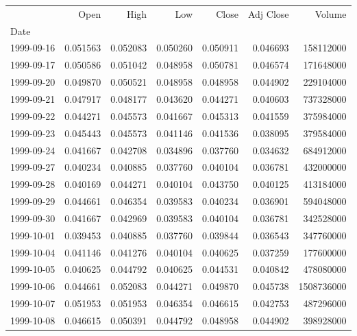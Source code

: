 \begin{tabular}{lrrrrrr}
\toprule
{} &        Open &        High &         Low &       Close &   Adj Close &      Volume \\
Date       &             &             &             &             &             &             \\
\midrule
1999-09-16 &    0.051563 &    0.052083 &    0.050260 &    0.050911 &    0.046693 &   158112000 \\
1999-09-17 &    0.050586 &    0.051042 &    0.048958 &    0.050781 &    0.046574 &   171648000 \\
1999-09-20 &    0.049870 &    0.050521 &    0.048958 &    0.048958 &    0.044902 &   229104000 \\
1999-09-21 &    0.047917 &    0.048177 &    0.043620 &    0.044271 &    0.040603 &   737328000 \\
1999-09-22 &    0.044271 &    0.045573 &    0.041667 &    0.045313 &    0.041559 &   375984000 \\
1999-09-23 &    0.045443 &    0.045573 &    0.041146 &    0.041536 &    0.038095 &   379584000 \\
1999-09-24 &    0.041667 &    0.042708 &    0.034896 &    0.037760 &    0.034632 &   684912000 \\
1999-09-27 &    0.040234 &    0.040885 &    0.037760 &    0.040104 &    0.036781 &   432000000 \\
1999-09-28 &    0.040169 &    0.044271 &    0.040104 &    0.043750 &    0.040125 &   413184000 \\
1999-09-29 &    0.044661 &    0.046354 &    0.039583 &    0.040234 &    0.036901 &   594048000 \\
1999-09-30 &    0.041667 &    0.042969 &    0.039583 &    0.040104 &    0.036781 &   342528000 \\
1999-10-01 &    0.039453 &    0.040885 &    0.037760 &    0.039844 &    0.036543 &   347760000 \\
1999-10-04 &    0.041146 &    0.041276 &    0.040104 &    0.040625 &    0.037259 &   177600000 \\
1999-10-05 &    0.040625 &    0.044792 &    0.040625 &    0.044531 &    0.040842 &   478080000 \\
1999-10-06 &    0.044661 &    0.052083 &    0.044271 &    0.049870 &    0.045738 &  1508736000 \\
1999-10-07 &    0.051953 &    0.051953 &    0.046354 &    0.046615 &    0.042753 &   487296000 \\
1999-10-08 &    0.046615 &    0.050391 &    0.044792 &    0.048958 &    0.044902 &   398928000 \\

\end{tabular}
